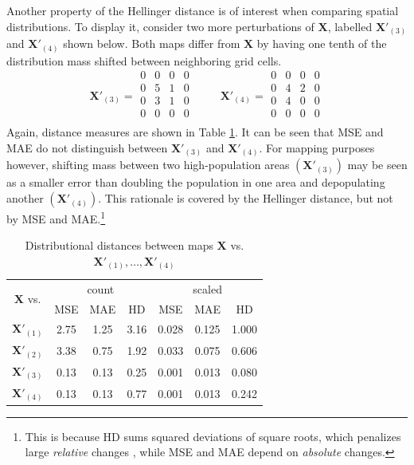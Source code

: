 \begin{tcolorbox}[breakable]
Another property of the Hellinger distance is of interest when comparing spatial distributions. To display it, consider two more perturbations of $\mathbf{X}$, labelled $\mathbf{X}'_{(3)}$ and $\mathbf{X}'_{(4)}$ shown below. Both maps differ from $\mathbf{X}$ by having one tenth of the distribution mass shifted between neighboring grid cells.
\[
\mathbf{X}'_{(3)} =
\begin{matrix} 
0 & 0 & 0 & 0 \\
0 & 5 & 1 & 0 \\
0 & 3 & 1 & 0 \\
0 & 0 & 0 & 0 \\
\end{matrix} \hspace{1cm}
\mathbf{X}'_{(4)} =
\begin{matrix} 
0 & 0 & 0 & 0 \\
0 & 4 & 2 & 0 \\
0 & 4 & 0 & 0 \\
0 & 0 & 0 & 0 \\
\end{matrix}
\]
Again, distance measures are shown in Table \ref{tab:util_hd_mae_mse}. It can be seen that MSE and MAE do not distinguish between $\mathbf{X}'_{(3)}$ and $\mathbf{X}'_{(4)}$. For mapping purposes however, shifting mass between two high-population areas $(\mathbf{X}'_{(3)})$ may be seen as a smaller error than doubling the population in one area and depopulating another $(\mathbf{X}'_{(4)})$. This rationale is covered by the Hellinger distance, but not by MSE and MAE.\footnote{
    This is because HD sums squared deviations of square roots, which penalizes large \emph{relative} changes \citep{AntalEtAl2017}, while MSE and MAE depend on \emph{absolute} changes.}

\begin{table}[H]
    \centering
    \begin{tabular}{c | c c c | c c c |}
            \multirow{2}{*}{$\mathbf{X}$ vs. }& \multicolumn{3}{c}{count} & \multicolumn{3}{c}{scaled} \\
               & MSE & MAE & HD & MSE & MAE & HD \\
        \hline
    $\mathbf{X}'_{(1)}$ & 2.75 & 1.25 & 3.16 & 0.028 & 0.125 & 1.000 \\
    $\mathbf{X}'_{(2)}$ & 3.38 & 0.75 & 1.92 & 0.033 & 0.075 & 0.606 \\
    $\mathbf{X}'_{(3)}$ & 0.13 & 0.13 & 0.25 & 0.001 & 0.013 & 0.080 \\
    $\mathbf{X}'_{(4)}$ & 0.13 & 0.13 & 0.77 & 0.001 & 0.013 & 0.242 \\
        \hline
    \end{tabular}
    \caption{Distributional distances between maps $\mathbf{X}$ vs. $\mathbf{X}'_{(1)}, \dots, \mathbf{X}'_{(4)}$}
    \label{tab:util_hd_mae_mse}
\end{table}
\end{tcolorbox}


